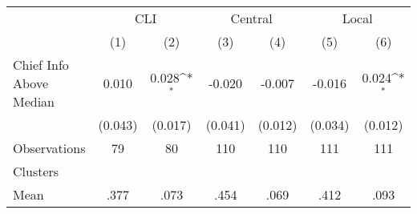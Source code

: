 {
\def\sym#1{\ifmmode^{#1}\else\(^{#1}\)\fi}
\begin{tabular}{l*{6}{c}}
\hline\hline
                &\multicolumn{2}{c}{CLI}              &\multicolumn{2}{c}{Central}          &\multicolumn{2}{c}{Local}            \\
                &\multicolumn{1}{c}{(1)}         &\multicolumn{1}{c}{(2)}         &\multicolumn{1}{c}{(3)}         &\multicolumn{1}{c}{(4)}         &\multicolumn{1}{c}{(5)}         &\multicolumn{1}{c}{(6)}         \\
\hline
Chief Info Above Median&    0.010         &    0.028\sym{*}  &   -0.020         &   -0.007         &   -0.016         &    0.024\sym{*}  \\
                &  (0.043)         &  (0.017)         &  (0.041)         &  (0.012)         &  (0.034)         &  (0.012)         \\
\hline
Observations    &       79         &       80         &      110         &      110         &      111         &      111         \\
Clusters        &                  &                  &                  &                  &                  &                  \\
Mean            &     .377         &     .073         &     .454         &     .069         &     .412         &     .093         \\
\hline\hline
\end{tabular}
}

